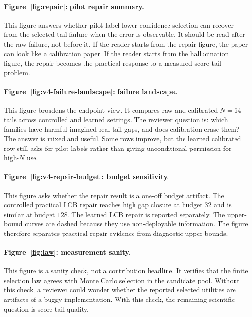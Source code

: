 \documentclass{article}
\begin{document}
\paragraph{Figure~\ref{fig:repair}: pilot repair summary.}
This figure answers whether pilot-label lower-confidence selection can recover
from the selected-tail failure when the error is observable. It should be read
after the raw failure, not before it. If the reader starts from the repair
figure, the paper can look like a calibration paper. If the reader starts from
the hallucination figure, the repair becomes the practical response to a
measured score-tail problem.

\paragraph{Figure~\ref{fig:v4-failure-landscape}: failure landscape.}
This figure broadens the endpoint view. It compares raw and calibrated
$N=64$ tails across controlled and learned settings. The reviewer question is:
which families have harmful imagined-real tail gaps, and does calibration
erase them? The answer is mixed and useful. Some rows improve, but the learned
calibrated row still asks for pilot labels rather than giving unconditional
permission for high-$N$ use.

\paragraph{Figure~\ref{fig:v4-repair-budget}: budget sensitivity.}
This figure asks whether the repair result is a one-off budget artifact. The
controlled practical LCB repair reaches high gap closure at budget $32$ and is
similar at budget $128$. The learned LCB repair is reported separately. The
upper-bound curves are dashed because they use non-deployable information.
The figure therefore separates practical repair evidence from diagnostic
upper bounds.

\paragraph{Figure~\ref{fig:law}: measurement sanity.}
This figure is a sanity check, not a contribution headline. It verifies that
the finite selection law agrees with Monte Carlo selection in the candidate
pool. Without this check, a reviewer could wonder whether the reported
selected utilities are artifacts of a buggy implementation. With this check,
the remaining scientific question is score-tail quality.
\end{document}
